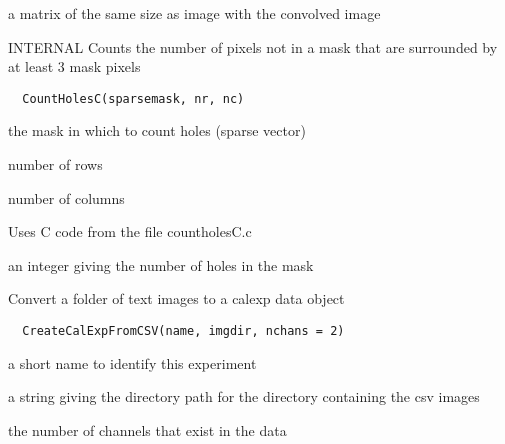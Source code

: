 \documentclass[a4paper]{book}
\begin{document}
%
\begin{Value}
a matrix of the same size as image with the convolved
image
\end{Value}
%
\begin{Description}\relax
INTERNAL Counts the number of pixels not in a mask that
are surrounded by at least 3 mask pixels
\end{Description}
%
\begin{Usage}
\begin{verbatim}
  CountHolesC(sparsemask, nr, nc)
\end{verbatim}
\end{Usage}
%
\begin{Arguments}
\begin{ldescription}
\item[\code{sparsemask}] the mask in which to count holes
(sparse vector)

\item[\code{nr}] number of rows

\item[\code{nc}] number of columns
\end{ldescription}
\end{Arguments}
%
\begin{Details}\relax
Uses C code from the file countholesC.c
\end{Details}
%
\begin{Value}
an integer giving the number of holes in the mask
\end{Value}
%
\begin{Description}\relax
Convert a folder of text images to a calexp data object
\end{Description}
%
\begin{Usage}
\begin{verbatim}
  CreateCalExpFromCSV(name, imgdir, nchans = 2)
\end{verbatim}
\end{Usage}
%
\begin{Arguments}
\begin{ldescription}
\item[\code{name}] a short name to identify this experiment

\item[\code{imgdir}] a string giving the directory path for the
directory containing the csv images

\item[\code{nchans}] the number of channels that exist in the
data
\end{ldescription}
\end{Arguments}
\end{document}
